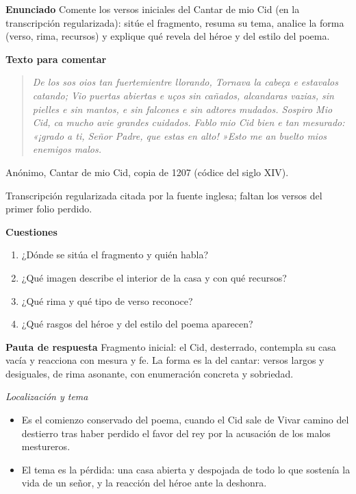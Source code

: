 \documentclass{book}
\begin{document}
\begin{tcolorbox}[title={Ejercicio resuelto}, studiumworked, breakable]

\noindent\textbf{Enunciado}
Comente los versos iniciales del Cantar de mio Cid (en la transcripción regularizada): sitúe el fragmento, resuma su tema, analice la forma (verso, rima, recursos) y explique qué revela del héroe y del estilo del poema.


\noindent\textbf{Texto para comentar}

\begin{quote}
\itshape De los sos oios tan fuertemientre llorando, Tornava la cabeça e estavalos catando; Vio puertas abiertas e uços sin cañados, alcandaras vazias, sin pielles e sin mantos, e sin falcones e sin adtores mudados. Sospiro Mio Cid, ca mucho avie grandes cuidados. Fablo mio Cid bien e tan mesurado: «¡grado a ti, Señor Padre, que estas en alto! »Esto me an buelto mios enemigos malos.
\end{quote}
{\noindent\footnotesize Anónimo, Cantar de mio Cid, copia de 1207 (códice del siglo XIV).\par}
{\noindent\footnotesize Transcripción regularizada citada por la fuente inglesa; faltan los versos del primer folio perdido.\par}

\noindent\textbf{Cuestiones}
\begin{enumerate}
\item ¿Dónde se sitúa el fragmento y quién habla?
\item ¿Qué imagen describe el interior de la casa y con qué recursos?
\item ¿Qué rima y qué tipo de verso reconoce?
\item ¿Qué rasgos del héroe y del estilo del poema aparecen?
\end{enumerate}

\noindent\textbf{Pauta de respuesta}
Fragmento inicial: el Cid, desterrado, contempla su casa vacía y reacciona con mesura y fe. La forma es la del cantar: versos largos y desiguales, de rima asonante, con enumeración concreta y sobriedad.


\noindent\textit{Localización y tema}
\begin{itemize}
\item Es el comienzo conservado del poema, cuando el Cid sale de Vivar camino del destierro tras haber perdido el favor del rey por la acusación de los malos mestureros.
\item El tema es la pérdida: una casa abierta y despojada de todo lo que sostenía la vida de un señor, y la reacción del héroe ante la deshonra.
\end{itemize}


\end{tcolorbox}
\end{document}
